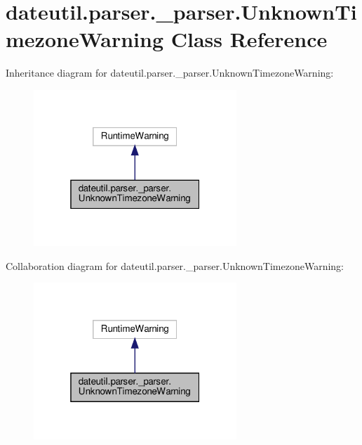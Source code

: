 \hypertarget{classdateutil_1_1parser_1_1__parser_1_1UnknownTimezoneWarning}{}\section{dateutil.\+parser.\+\_\+parser.\+Unknown\+Timezone\+Warning Class Reference}
\label{classdateutil_1_1parser_1_1__parser_1_1UnknownTimezoneWarning}


Inheritance diagram for dateutil.\+parser.\+\_\+parser.\+Unknown\+Timezone\+Warning\+:
\nopagebreak
\begin{figure}[H]
\begin{center}
\leavevmode
\includegraphics[width=217pt]{classdateutil_1_1parser_1_1__parser_1_1UnknownTimezoneWarning__inherit__graph}
\end{center}
\end{figure}


Collaboration diagram for dateutil.\+parser.\+\_\+parser.\+Unknown\+Timezone\+Warning\+:
\nopagebreak
\begin{figure}[H]
\begin{center}
\leavevmode
\includegraphics[width=217pt]{classdateutil_1_1parser_1_1__parser_1_1UnknownTimezoneWarning__coll__graph}
\end{center}
\end{figure}


